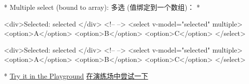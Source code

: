 \begin{paracol}{2}
\switchcolumn[0]*%
Multiple select (bound to array):
\switchcolumn
多选 (值绑定到一个数组)：
\switchcolumn[0]*%
\begin{codeHtml}
<div>Selected: {{ selected }}</div>
<!-- -->
<select v-model="selected" multiple>
  <option>A</option>
  <option>B</option>
  <option>C</option>
</select>
\end{codeHtml}
\switchcolumn
\begin{codeHtml}
<div>Selected: {{ selected }}</div>
<!-- -->
<select v-model="selected" multiple>
  <option>A</option>
  <option>B</option>
  <option>C</option>
</select>
\end{codeHtml}
\switchcolumn[0]*%
\href{https://play.vuejs.org/\#eNp1kL2OwjAQhF9l5Ya74i7QBhMJeARKTIESIyz5Z5VsAsjyu7NOQEBB5xl/M7vaKNaI/0OvRSlkV7cGCTpNPVbKG4ehJYjQ6hMkOLXBwYzRmfLK18F3GbW6Jt3AKkM/+8Ov8rKYeriBBWmH9kiaFYBszFDtHpkSYnwVpCSL/JtDDE4+DH8uNNqulHiCSoDrLRm0UyWzAckEX61l8Xh9+psv/vbD563HCSxk8bY0y45u47AJ2D/HHyDm4MU0dC5hMZ/jdal8Gg8wJkS6A3nRew4=}{Try
it in the Playground}
\switchcolumn
\href{https://play.vuejs.org/\#eNp1kL2OwjAQhF9l5Ya74i7QBhMJeARKTIESIyz5Z5VsAsjyu7NOQEBB5xl/M7vaKNaI/0OvRSlkV7cGCTpNPVbKG4ehJYjQ6hMkOLXBwYzRmfLK18F3GbW6Jt3AKkM/+8Ov8rKYeriBBWmH9kiaFYBszFDtHpkSYnwVpCSL/JtDDE4+DH8uNNqulHiCSoDrLRm0UyWzAckEX61l8Xh9+psv/vbD563HCSxk8bY0y45u47AJ2D/HHyDm4MU0dC5hMZ/jdal8Gg8wJkS6A3nRew4=}{在演练场中尝试一下}



\end{paracol}
